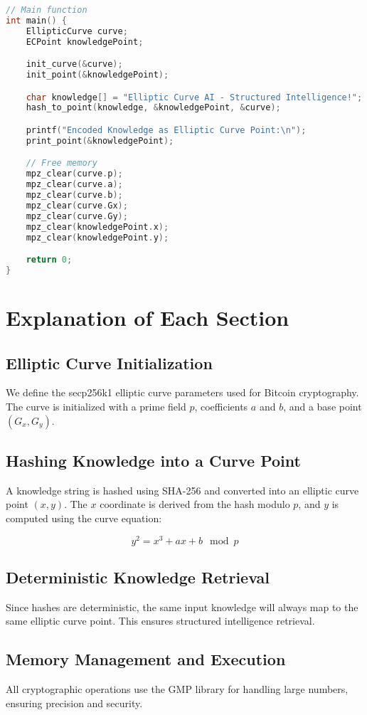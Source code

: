 \documentclass{article}
\begin{document}
\begin{lstlisting}[language=C, basicstyle=\ttfamily\small, caption=ECAI Implementation in C]
// Main function
int main() {
    EllipticCurve curve;
    ECPoint knowledgePoint;

    init_curve(&curve);
    init_point(&knowledgePoint);

    char knowledge[] = "Elliptic Curve AI - Structured Intelligence!";
    hash_to_point(knowledge, &knowledgePoint, &curve);

    printf("Encoded Knowledge as Elliptic Curve Point:\n");
    print_point(&knowledgePoint);

    // Free memory
    mpz_clear(curve.p);
    mpz_clear(curve.a);
    mpz_clear(curve.b);
    mpz_clear(curve.Gx);
    mpz_clear(curve.Gy);
    mpz_clear(knowledgePoint.x);
    mpz_clear(knowledgePoint.y);

    return 0;
}
\end{lstlisting}

\section{Explanation of Each Section}

\subsection{Elliptic Curve Initialization}
We define the secp256k1 elliptic curve parameters used for Bitcoin cryptography. The curve is initialized with a prime field $p$, coefficients $a$ and $b$, and a base point $(G_x, G_y)$.

\subsection{Hashing Knowledge into a Curve Point}
A knowledge string is hashed using SHA-256 and converted into an elliptic curve point $(x, y)$. The $x$ coordinate is derived from the hash modulo $p$, and $y$ is computed using the curve equation:

\begin{equation}
y^2 = x^3 + ax + b \mod p
\end{equation}

\subsection{Deterministic Knowledge Retrieval}
Since hashes are deterministic, the same input knowledge will always map to the same elliptic curve point. This ensures structured intelligence retrieval.

\subsection{Memory Management and Execution}
All cryptographic operations use the GMP library for handling large numbers, ensuring precision and security.
\end{document}
